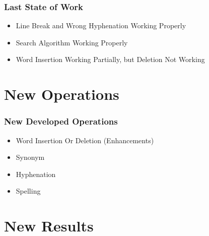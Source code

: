 \documentclass{beamer}
\begin{document}
\begin{frame}
\frametitle{Last State of Work}
\begin{itemize}
\item Line Break and Wrong Hyphenation Working Properly
\item Search Algorithm Working Properly
\item Word Insertion Working Partially, but Deletion Not Working
\end{itemize}
\end{frame}

\section{New Operations}
\begin{frame}
\frametitle{New Developed Operations}
\begin{itemize}
	\item Word Insertion Or Deletion (Enhancements)
	\item Synonym
	\item Hyphenation
	\item Spelling
\end{itemize}
\end{frame}

\section{New Results}
\end{document}
